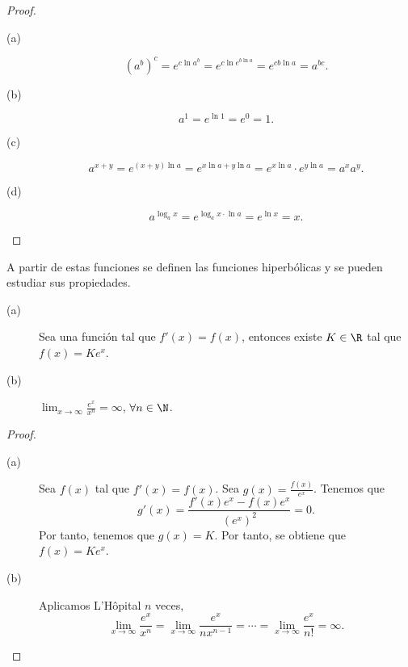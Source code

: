 \begin{proof}
\begin{description}
\item[(a)] 
	\[ \left(a^{b}\right)^{c} = e^{c\ln a^{b}} = e^{c\ln e^{b\ln a}} = e^{cb\ln a}= a^{bc} .\]
\item[(b)] 
	\[ a^{1} = e^{\ln 1} = e^{0} = 1 .\]
\item[(c)] 
	\[a^{x + y} = e^{\left(x+y\right)\ln a} = e^{x\ln a + y\ln a} = e^{x\ln a} \cdot e^{y \ln a} = a^{x}a^{y} .\]
\item[(d)] 
	\[ a^{\log_{a}x} = e^{\log_{a}x \cdot \ln a}= e^{\ln x}= x .\]
\end{description}
\end{proof}
\begin{observation}
\normalfont A partir de estas funciones se definen las funciones hiperbólicas y se pueden estudiar sus propiedades.
\end{observation}
\begin{fprop}[]
\normalfont 
\begin{description}
\item[(a)] Sea una función tal que $\displaystyle f'\left(x\right) = f\left(x\right) $, entonces existe $\displaystyle K \in \R $ tal que $\displaystyle f\left(x\right) = Ke^{x} $.
\item[(b)] $\displaystyle \lim_{x \to \infty}\frac{e^{x}}{x^{n}} = \infty $, $\displaystyle \forall n \in \N $.
\end{description}
\end{fprop}
\begin{proof}
\begin{description}
\item[(a)] Sea $\displaystyle f\left(x\right) $ tal que $\displaystyle f'\left(x\right) = f\left(x\right) $. Sea $\displaystyle g\left(x\right) = \frac{f\left(x\right)}{e^{x}} $. Tenemos que
	\[ g'\left(x\right) = \frac{f'\left(x\right)e^{x}-f\left(x\right)e^{x}}{\left(e^{x}\right)^{2}} = 0 .\]
	Por tanto, tenemos que $\displaystyle g\left(x\right) = K $. Por tanto, se obtiene que $\displaystyle f\left(x\right) = Ke^{x} $.
\item[(b)] Aplicamos L'Hôpital $\displaystyle n $ veces,
	\[ \lim_{x \to \infty}\frac{e^{x}}{x^{n}} = \lim_{x \to \infty}\frac{e^{x}}{nx^{n-1}} = \cdots = \lim_{x \to \infty}\frac{e^{x}}{n!} = \infty .\]
\end{description}
\end{proof}
